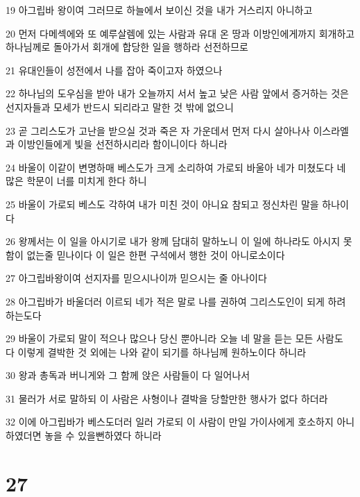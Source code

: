 \par 19 아그립바 왕이여 그러므로 하늘에서 보이신 것을 내가 거스리지 아니하고
\par 20 먼저 다메섹에와 또 예루살렘에 있는 사람과 유대 온 땅과 이방인에게까지 회개하고 하나님께로 돌아가서 회개에 합당한 일을 행하라 선전하므로
\par 21 유대인들이 성전에서 나를 잡아 죽이고자 하였으나
\par 22 하나님의 도우심을 받아 내가 오늘까지 서서 높고 낮은 사람 앞에서 증거하는 것은 선지자들과 모세가 반드시 되리라고 말한 것 밖에 없으니
\par 23 곧 그리스도가 고난을 받으실 것과 죽은 자 가운데서 먼저 다시 살아나사 이스라엘과 이방인들에게 빛을 선전하시리라 함이니이다 하니라
\par 24 바울이 이같이 변명하매 베스도가 크게 소리하여 가로되 바울아 네가 미쳤도다 네 많은 학문이 너를 미치게 한다 하니
\par 25 바울이 가로되 베스도 각하여 내가 미친 것이 아니요 참되고 정신차린 말을 하나이다
\par 26 왕께서는 이 일을 아시기로 내가 왕께 담대히 말하노니 이 일에 하나라도 아시지 못함이 없는줄 믿나이다 이 일은 한편 구석에서 행한 것이 아니로소이다
\par 27 아그립바왕이여 선지자를 믿으시나이까 믿으시는 줄 아나이다
\par 28 아그립바가 바울더러 이르되 네가 적은 말로 나를 권하여 그리스도인이 되게 하려 하는도다
\par 29 바울이 가로되 말이 적으나 많으나 당신 뿐아니라 오늘 네 말을 듣는 모든 사람도 다 이렇게 결박한 것 외에는 나와 같이 되기를 하나님께 원하노이다 하니라
\par 30 왕과 총독과 버니게와 그 함께 앉은 사람들이 다 일어나서
\par 31 물러가 서로 말하되 이 사람은 사형이나 결박을 당할만한 행사가 없다 하더라
\par 32 이에 아그립바가 베스도더러 일러 가로되 이 사람이 만일 가이사에게 호소하지 아니하였더면 놓을 수 있을뻔하였다 하니라

\chapter{27}

